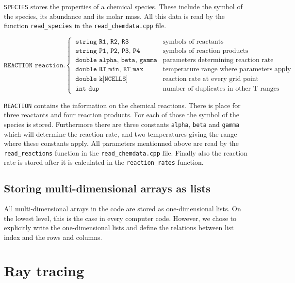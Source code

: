 \documentclass[]{article}
\begin{document}
\texttt{SPECIES} stores the properties of a chemical species. These include the symbol of the species, its abundance and its molar mass. All this data is read by the function \texttt{read\_species} in the \texttt{read\_chemdata.cpp} file.

\begin{equation}
\texttt{REACTION reaction.}
\begin{cases}
\ \texttt{string R1, R2, R3} & \text{symbols of reactants}\\
\ \texttt{string P1, P2, P3, P4} & \text{symbols of reaction products} \\
\ \texttt{double alpha, beta, gamma} &  \text{parameters determining reaction rate} \\
\ \texttt{double RT\_min, RT\_max} &  \text{temperature range where parameters apply} \\
\ \texttt{double k[NCELLS]} &  \text{reaction rate at every grid point} \\
\ \texttt{int    dup} &  \text{number of duplicates in other T ranges}
\end{cases}
\end{equation}

\texttt{REACTION} contains the information on the chemical reactions. There is place for three reactants and four reaction products. For each of those the symbol of the species is stored. Furthermore there are three constants \texttt{alpha}, \texttt{beta} and \texttt{gamma} which will determine the reaction rate, and two temperatures giving the range where these constants apply. All parameters mentionned above are read by the \texttt{read\_reactions} function in the \texttt{read\_chemdata.cpp} file. Finally also the reaction rate is stored after it is calculated in the \texttt{reaction\_rates} function.


\subsection{Storing multi-dimensional arrays as lists}

All multi-dimensional arrays in the code are stored as one-dimensional lists. On the lowest level, this is the case in every computer code. However, we chose to explicitly write the one-dimensional lists and define the relations between list index and the rows and columns.

\section{Ray tracing}
\end{document}
